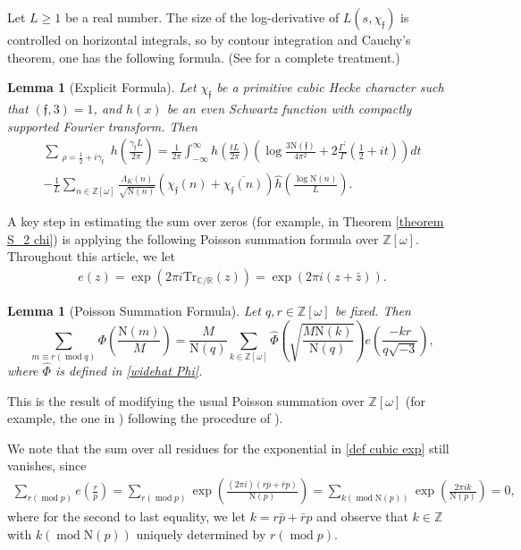 \documentclass[11pt]{amsart}
\newcommand{\norm}{\mathrm{N}}
\newtheorem{lemma}[prop]{Lemma}
\numberwithin{equation}{section}
\newcommand{\mymod}[1]{(\operatorname{mod} #1)}
\theoremstyle{remark}
\begin{document}
Let $L \ge 1$ be a real number. The size of the log-derivative of $L(s, \chi_\mathfrak{f})$ is controlled on horizontal integrals, so by contour integration and Cauchy's theorem, one has the following formula. (See \cite[Lemmata 2.4-2.6]{DG} for a complete treatment.) 
\begin{lemma} [Explicit Formula]\label{explicit formula}
    Let $\chi_\mathfrak{f}$ be a primitive cubic Hecke character such that $(\mathfrak{f}, 3)=1$, and $h(x)$ be an even Schwartz function with compactly supported Fourier transform. Then
    \begin{align*}
        \sum_{\substack{\rho =\frac{1}{2}+i\gamma_\mathfrak{f}}} h\left( \frac{\gamma_\mathfrak{f}L}{2\pi} \right)
        =
        \frac{1}{2\pi}\int_{-\infty}^\infty h\left( \frac{tL}{2\pi} \right)
        \left( \log \frac{3\norm(\mathfrak{f})}{4\pi^2} + 2\frac{\Gamma^\prime}{\Gamma}\left(\frac{1}{2}+it\right) \right)dt
        \\
        -\frac{1}{L}\sum_{n\in \mathbb{Z}[\omega]}\frac{\Lambda_K(n)}{\sqrt{\norm(n)}}
        \left( \chi_\mathfrak{f}(n)+\overline{\chi_\mathfrak{f}(n)} \right) \hat{h}\left( \frac{\log\norm(n)}{L} \right).
    \end{align*}
\end{lemma}



A key step in estimating the sum over zeros (for example, in Theorem \ref{theorem S_2 chi}) is applying the following Poisson summation formula over $\mathbb{Z}[\omega]$. Throughout this article, we let
\begin{align}\label{def cubic exp}
    e(z)=\exp(2\pi i \mathrm{Tr}_{\mathbb{C}/\mathbb{R}}(z))=\exp(2\pi i (z+\bar{z})).
\end{align}

\begin{lemma}[Poisson Summation Formula]
    \label{lemma Poisson}
    Let $q, r\in \mathbb{Z}[\omega]$ be fixed. Then 
    $$\sum_{m\equiv r\mymod q} \Phi\left(\frac{\norm(m)}{M}\right)=\frac{M}{\norm(q)}\sum_{k\in \mathbb{Z}[\omega]}\widehat{\Phi}\left(\sqrt{\frac{M\norm(k)}{\norm(q)}} \right)e\left(\frac{-kr}{q\sqrt{-3}}\right),$$
    where $\widehat{\Phi}$ is defined in \eqref{widehat Phi}.
\end{lemma}
\noindent
This is the result of modifying the usual Poisson summation over $\mathbb{Z}[\omega]$ (for example, the one in \cite[Lemma 2.9]{DG}) following the procedure of \cite[Lemma 7]{RaSo15}).

We note that the sum over all residues for the exponential in \eqref{def cubic exp} still vanishes, since
\begin{align*}
    \sum_{r\mymod{p}}e\left(\frac{r}{p}\right)
    =
    \sum_{r\mymod{p}}\exp\left(\frac{(2\pi i)(r\bar{p}+\bar{r}p)}{\norm(p)}\right)
    =
    \sum_{k\mymod{\norm(p)}}\exp\left(\frac{2\pi ik}{\norm(p)}\right)
    =
    0,
\end{align*}
where for the second to last equality, we let
$k=r\bar{p}+\bar{r}p$ and observe that $k\in \mathbb{Z}$ with $k\mymod{\norm(p)}$ uniquely determined by $r\mymod{p}.$ 
\end{document}
